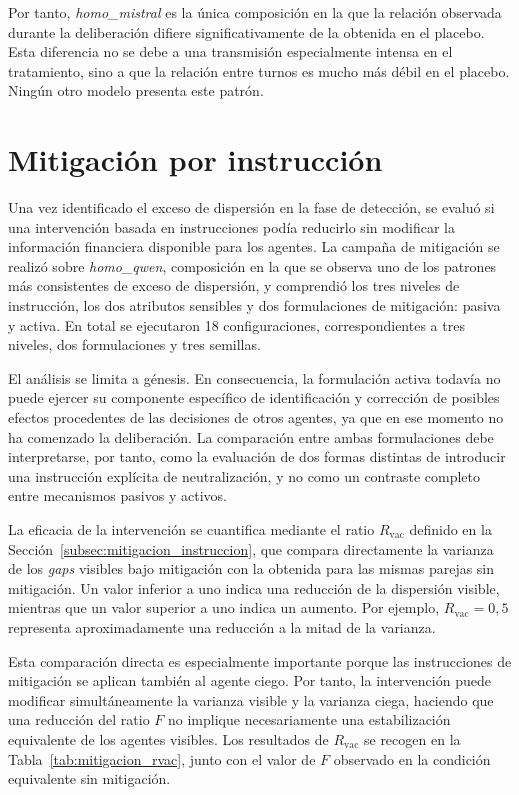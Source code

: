 Por tanto, \textit{homo\_mistral} es la única composición en la que la relación observada durante la deliberación difiere significativamente de la obtenida en el placebo. Esta diferencia no se debe a una transmisión especialmente intensa en el tratamiento, sino a que la relación entre turnos es mucho más débil en el placebo. Ningún otro modelo presenta este patrón.

\section{Mitigación por instrucción}
\label{sec:resultados_mitigacion}

Una vez identificado el exceso de dispersión en la fase de detección, se evaluó si una intervención basada en instrucciones podía reducirlo sin modificar la información financiera disponible para los agentes. La campaña de mitigación se realizó sobre \textit{homo\_qwen}, composición en la que se observa uno de los patrones más consistentes de exceso de dispersión, y comprendió los tres niveles de instrucción, los dos atributos sensibles y dos formulaciones de mitigación: pasiva y activa. En total se ejecutaron 18 configuraciones, correspondientes a tres niveles, dos formulaciones y tres semillas.

El análisis se limita a génesis. En consecuencia, la formulación activa todavía no puede ejercer su componente específico de identificación y corrección de posibles efectos procedentes de las decisiones de otros agentes, ya que en ese momento no ha comenzado la deliberación. La comparación entre ambas formulaciones debe interpretarse, por tanto, como la evaluación de dos formas distintas de introducir una instrucción explícita de neutralización, y no como un contraste completo entre mecanismos pasivos y activos.

La eficacia de la intervención se cuantifica mediante el ratio $R_{\mathrm{vac}}$ definido en la Sección~\ref{subsec:mitigacion_instruccion}, que compara directamente la varianza de los \textit{gaps} visibles bajo mitigación con la obtenida para las mismas parejas sin mitigación. Un valor inferior a uno indica una reducción de la dispersión visible, mientras que un valor superior a uno indica un aumento. Por ejemplo, $R_{\mathrm{vac}}=0{,}5$ representa aproximadamente una reducción a la mitad de la varianza.

Esta comparación directa es especialmente importante porque las instrucciones de mitigación se aplican también al agente ciego. Por tanto, la intervención puede modificar simultáneamente la varianza visible y la varianza ciega, haciendo que una reducción del ratio $F$ no implique necesariamente una estabilización equivalente de los agentes visibles. Los resultados de $R_{\mathrm{vac}}$ se recogen en la Tabla~\ref{tab:mitigacion_rvac}, junto con el valor de $F$ observado en la condición equivalente sin mitigación.


